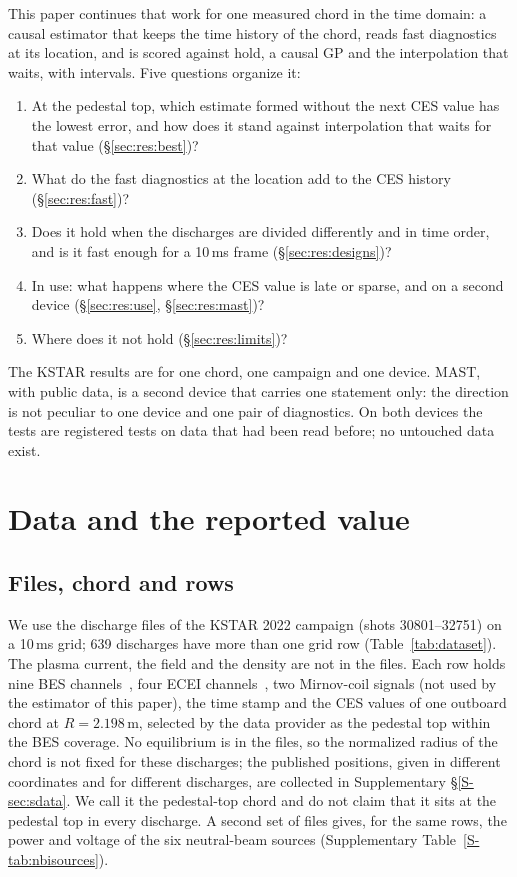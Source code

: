 \documentclass[11pt,a4paper]{article}
\newcommand{\Supp}[1]{Supplementary \S\ref{S-#1}}
\newcommand{\SuppTab}[1]{Supplementary Table~\ref{S-#1}}
\begin{document}
This paper continues that work for one measured chord in the time domain: a causal
estimator that keeps the time history of the chord, reads fast diagnostics at its
location, and is scored against hold, a causal GP and the interpolation that waits, with
intervals. Five questions organize it:
\begin{enumerate}\setlength{\itemsep}{1pt}\setlength{\parskip}{0pt}
\item At the pedestal top, which estimate formed without the next CES value has the
lowest error, and how does it stand against interpolation that waits for that value
(\S\ref{sec:res:best})?
\item What do the fast diagnostics at the location add to the CES history
(\S\ref{sec:res:fast})?
\item Does it hold when the discharges are divided differently and in time order, and is
it fast enough for a 10\,ms frame (\S\ref{sec:res:designs})?
\item In use: what happens where the CES value is late or sparse, and on a second device
(\S\ref{sec:res:use}, \S\ref{sec:res:mast})?
\item Where does it not hold (\S\ref{sec:res:limits})?
\end{enumerate}

The KSTAR results are for one chord, one campaign and one device. MAST, with public data,
is a second device that carries one statement only: the direction is not peculiar to one
device and one pair of diagnostics. On both devices the tests are registered tests on
data that had been read before; no untouched data exist.

\section{Data and the reported value}
\label{sec:data}

\subsection{Files, chord and rows}
\label{sec:data:files}

We use the \NFiles{} discharge files of the KSTAR 2022 campaign (shots 30801--32751) on a
10\,ms grid; 639 discharges have more than one grid row (Table~\ref{tab:dataset}). The
plasma current, the field and the density are not in the files. Each row holds nine BES
channels~\citep{Lampert2015CombinedHydrogen,KFE2026DiagnosticsDataUserGuide}, four ECEI
channels~\citep{Yun2010DevelopmentKstar}, two Mirnov-coil signals (not used by the
estimator of this paper), the time stamp and the CES values of one outboard chord at
$R = 2.198$\,m, selected by the data provider as the pedestal top within the BES coverage.
No equilibrium is in the files, so the normalized radius of the chord is not fixed for
these discharges; the published positions, given in different coordinates and for
different discharges, are collected in \Supp{sec:sdata}. We call it the pedestal-top
chord and do not claim that it sits at the pedestal top in every discharge. A second set
of files gives, for the same rows, the power and voltage of the six neutral-beam sources
(\SuppTab{tab:nbisources}).
\end{document}
